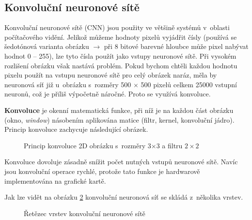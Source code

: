 \subsection*{Konvoluční neuronové sítě}
Konvoluční neuronové sítě (CNN) \cite{cnnNlp, cnnCv, cnnIntro} jsou použity ve většině systémů v~oblasti počítačového vidění. Jelikož můžeme hodnoty pixelů vyjádřit čísly (používá se šedotónová varianta obrázku $\rightarrow$ při 8 bitové barevné hloubce může pixel nabývat hodnot 0 -- 255), lze tyto čísla použít jako vstupy neuronové sítě. Při vysokém rozlišení obrázku však nastává problém. Pokud bychom chtěli každou hodnotu pixelu použít na vstupu neuronové sítě pro celý obrázek naráz, měla by neuronová síť již u~obrázku s~rozměry 500 $\times$ 500 pixelů celkem 25000 vstupní neuronů, což je příliš výpočetně náročné. Proto se využívá konvoluce.

\textbf{Konvoluce} je okenní matematická funkce, při níž je na každou část obrázku (okno, \emph{window}) násobením aplikována matice (filtr, kernel, konvoluční jádro). Princip konvoluce zachycuje následující obrázek.

\begin{figure}[H]
  \begin{center}
  \label{obrazek:principkonvoluce}
  \caption{Princip konvoluce 2D obrázku s~rozměry 3$\times$3 a filtru $2\times2$}
  \end{center}
\end{figure}

Konvoluce dovoluje zásadně snížit počet nutných vstupů neuronové sítě. Navíc jsou konvoluční operace rychlé, protože tato funkce je hardwarově implementována na grafické kartě.

Jak lze vidět na obrázku \ref{obrazek:cnnpipeline} konvoluční neuronová síť se skládá z~několika vrstev.

\begin{figure}[H]
  \begin{center}
  \label{obrazek:cnnpipeline}
  \caption{Řetězec vrstev konvoluční neuronové sítě \cite{cnnNlp}}
  \end{center}
\end{figure}

